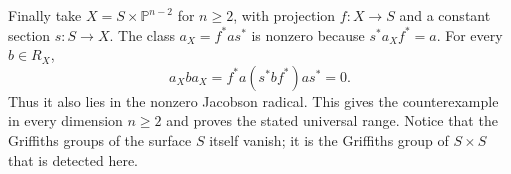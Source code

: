 Finally take $X=S\times\mathbb P^{n-2}$ for $n\ge2$, with
projection $f:X\to S$ and a constant section $s:S\to X$.
The class $a_X=f^*a s^*$ is nonzero because
$s^*a_X f^*=a$. For every $b\in R_X$,
\[
 a_X b a_X=f^*a(s^*b f^*)a s^*=0.
\]
Thus it also lies in the nonzero Jacobson radical. This gives
the counterexample in every dimension $n\ge2$ and proves
the stated universal range. Notice that the Griffiths groups
of the surface $S$ itself vanish; it is the Griffiths group
of $S\times S$ that is detected here.
